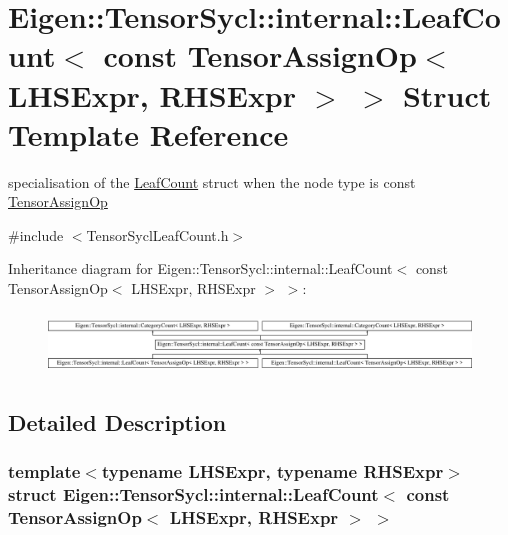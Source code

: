 \hypertarget{struct_eigen_1_1_tensor_sycl_1_1internal_1_1_leaf_count_3_01const_01_tensor_assign_op_3_01_l_h_sf4d5d47f44a2af8475f59a43337aef8a}{}\section{Eigen\+:\+:Tensor\+Sycl\+:\+:internal\+:\+:Leaf\+Count$<$ const Tensor\+Assign\+Op$<$ L\+H\+S\+Expr, R\+H\+S\+Expr $>$ $>$ Struct Template Reference}
\label{struct_eigen_1_1_tensor_sycl_1_1internal_1_1_leaf_count_3_01const_01_tensor_assign_op_3_01_l_h_sf4d5d47f44a2af8475f59a43337aef8a}


specialisation of the \hyperlink{struct_eigen_1_1_tensor_sycl_1_1internal_1_1_leaf_count}{Leaf\+Count} struct when the node type is const \hyperlink{class_eigen_1_1_tensor_assign_op}{Tensor\+Assign\+Op}  




{\ttfamily \#include $<$Tensor\+Sycl\+Leaf\+Count.\+h$>$}

Inheritance diagram for Eigen\+:\+:Tensor\+Sycl\+:\+:internal\+:\+:Leaf\+Count$<$ const Tensor\+Assign\+Op$<$ L\+H\+S\+Expr, R\+H\+S\+Expr $>$ $>$\+:\begin{figure}[H]
\begin{center}
\leavevmode
\includegraphics[height=1.612284cm]{struct_eigen_1_1_tensor_sycl_1_1internal_1_1_leaf_count_3_01const_01_tensor_assign_op_3_01_l_h_sf4d5d47f44a2af8475f59a43337aef8a}
\end{center}
\end{figure}


\subsection{Detailed Description}
\subsubsection*{template$<$typename L\+H\+S\+Expr, typename R\+H\+S\+Expr$>$\newline
struct Eigen\+::\+Tensor\+Sycl\+::internal\+::\+Leaf\+Count$<$ const Tensor\+Assign\+Op$<$ L\+H\+S\+Expr, R\+H\+S\+Expr $>$ $>$}


